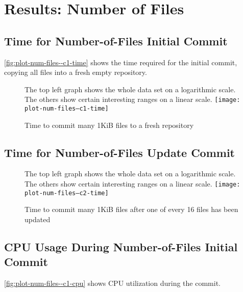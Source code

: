 %



\section{Results: Number of Files}


\subsection{Time for Number-of-Files Initial Commit}

\autoref{fig:plot-num-files--c1-time} shows the time
required for the initial commit, copying all files into a fresh empty
repository.


\begin{figure}[p]
    \caption{Time to commit many 1KiB files to a fresh repository}
    \label{fig:plot-num-files--c1-time}
    \centering
    The top left graph shows the whole data set on a logarithmic scale. The
    others show certain interesting ranges on a linear scale.
    \texttt{[image: plot-num-files--c1-time]}
\end{figure}

%


\subsection{Time for Number-of-Files Update Commit}


\begin{figure}[p]
    \caption{Time to commit many 1KiB files after one of every \num{16} files
    has been updated}
    \label{fig:plot-num-files--c2-time}
    \centering
    The top left graph shows the whole data set on a logarithmic scale. The
    others show certain interesting ranges on a linear scale.
    \texttt{[image: plot-num-files--c2-time]}
\end{figure}

%


\subsection{CPU Usage During Number-of-Files Initial Commit}

\autoref{fig:plot-num-files--c1-cpu} shows CPU utilization
during the commit.



